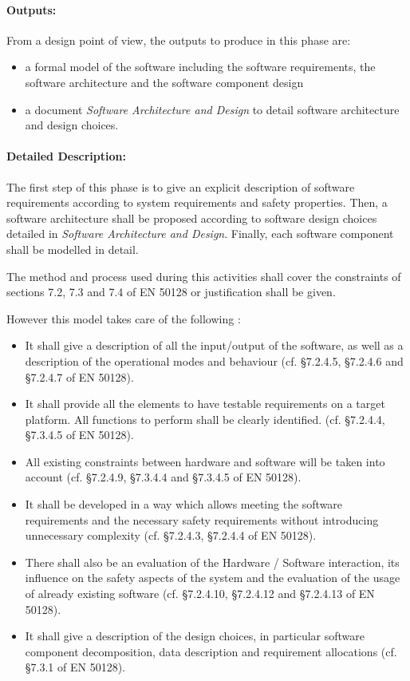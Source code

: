 \paragraph{Outputs:}
\label{sec:sw-req-documents}
From a design point of view, the outputs to produce in this phase are:

\begin{itemize}
\item a formal model of the software including the software requirements, the software architecture and the software component design
\item  a document  \textit{Software Architecture and Design} to  detail software architecture and design choices.
\end{itemize}


\paragraph{Detailed Description:}
\label{sec:sw-req-deta-descr}

The first step of this phase is to give an explicit description of software requirements according to system requirements and safety properties.  Then, a software architecture shall be proposed according to software design choices detailed in  \textit{Software Architecture and Design}.
Finally, each software component shall be modelled in detail.

The method and process used during this activities shall cover the constraints of sections 7.2, 7.3 and 7.4 of EN 50128 or justification shall be given.


However this model takes care of the following :

\begin{itemize}
\item It shall give a description of all the input/output of the software, as well as a description of the operational modes and behaviour (cf. §7.2.4.5,  §7.2.4.6 and  §7.2.4.7 of EN 50128). 
\item It shall provide all the elements to have testable requirements on a target platform. All functions to perform shall be clearly identified. (cf. §7.2.4.4, §7.3.4.5  of EN 50128).
\item All existing constraints between hardware and software will be taken into account (cf. §7.2.4.9, §7.3.4.4 and §7.3.4.5 of EN 50128).
\item It shall be developed in a way which allows meeting the software
requirements and the necessary safety requirements without introducing
unnecessary complexity (cf. §7.2.4.3,  §7.2.4.4  of EN 50128).
\item There shall also be an evaluation of the
Hardware / Software interaction, its influence on the safety aspects of the system and the
evaluation of the usage of already existing software  (cf. §7.2.4.10,  §7.2.4.12 and §7.2.4.13  of EN 50128).
\item It shall give a  description of the design choices, in particular software component decomposition, data description and requirement allocations (cf. §7.3.1 of EN 50128).
\end{itemize}

